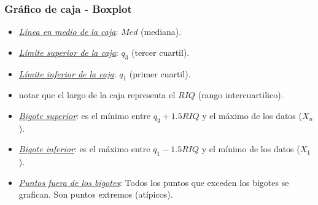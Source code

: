\documentclass{beamer}
\begin{document}


\begin{frame}
\frametitle{Gráfico de caja - Boxplot}
\begin{itemize}

\item \underline{\textit{Línea en medio de la caja}}: $Med$ (mediana).
\item \underline{\textit{Límite superior de la caja}}: $q_3$ (tercer cuartil).
\item \underline{\textit{Límite inferior de la caja}}: $q_1$ (primer cuartil).
\item notar que el largo de la caja representa el $RIQ$ (rango intercuartilico).
\item \underline{\textit{Bigote superior}}: es el mínimo entre $ q_3+ 1.5RIQ$ y el máximo de los datos ($X_n$).
\item \underline{\textit{Bigote inferior}}: es el máximo entre $q_1 - 1.5RIQ$ y el mínimo de los datos ($X_1$).
\item \underline{\textit{Puntos fuera de los bigotes}}: Todos los puntos que exceden los bigotes se grafican. Son puntos extremos (atípicos).
\end{itemize}
\end{frame}



 
     
\end{document}
